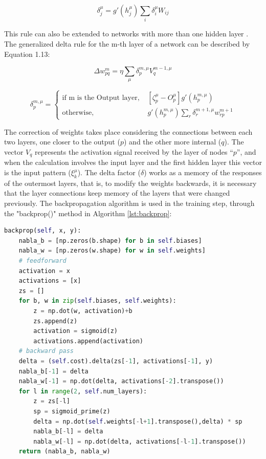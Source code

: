 \begin{equation*}
\delta_j^\mu=g'(h_j^\mu)\sum_i\delta_i^\mu W_{ij}
\end{equation*}

This rule can also be extended to networks with more than one hidden layer \cite{rateke1999}. The generalized delta rule for the m-th layer of a network can be described by Equation 1.13:

\begin{equation}
\Delta w_{pq}^m=\eta\sum_\mu\delta_p^{m,\mu}V_q^{m-1,\mu}
\end{equation}

\begin{equation}
\delta_p^{m, \mu} =
  \begin{cases}
    \text{if m is the Output layer, } &[\zeta_p^\mu-O_p^\mu]g'(h_p^{m,\mu})\\
    \text{otherwise, } &g'(h_p^{m,\mu})\sum_r\delta_r^{m+1,\mu}w_{rp}^{m+1}
  \end{cases}
\end{equation}

The correction of weights takes place considering the connections between each two layers, one closer to the output ($p$) and the other more internal ($q$). The vector $V_q$ represents the activation signal received by the layer of nodes “$p$”, and when the calculation involves the input layer and the first hidden layer this vector is the input pattern ($\xi_k^\mu$). The delta factor ($\delta$) works as a memory of the responses of the outermost layers, that is, to modify the weights backwards, it is necessary that the layer connections keep memory of the layers that were changed previously. The backpropagation algorithm is used in the training step, through the "backprop()" method in Algorithm \ref{lst:backprop}:

\begin{lstlisting}[caption={Backpropagation method in Python},label={lst:backprop},language=Python]
backprop(self, x, y):
    nabla_b = [np.zeros(b.shape) for b in self.biases]
    nabla_w = [np.zeros(w.shape) for w in self.weights]
    # feedforward
    activation = x
    activations = [x] 
    zs = [] 
    for b, w in zip(self.biases, self.weights):
        z = np.dot(w, activation)+b
        zs.append(z)
        activation = sigmoid(z)
        activations.append(activation)
    # backward pass
    delta = (self.cost).delta(zs[-1], activations[-1], y)
    nabla_b[-1] = delta
    nabla_w[-1] = np.dot(delta, activations[-2].transpose())
    for l in range(2, self.num_layers):
        z = zs[-l]
        sp = sigmoid_prime(z)
        delta = np.dot(self.weights[-l+1].transpose(),delta) * sp
        nabla_b[-l] = delta
        nabla_w[-l] = np.dot(delta, activations[-l-1].transpose())
    return (nabla_b, nabla_w)
\end{lstlisting}

